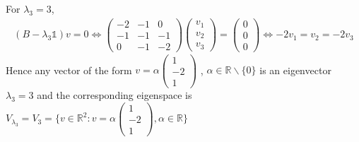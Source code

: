 \documentclass[a4paper,12pt,titlepage]{article}
\begin{document}
For $\lambda_3=3$,
\begin{align*}
(B-\lambda_3\mathds{1})v=0\Leftrightarrow\begin{pmatrix}
-2&-1&0\\-1&-1&-1\\0&-1&-2\end{pmatrix}\begin{pmatrix}
v_1\\v_2\\v_3\end{pmatrix}=\begin{pmatrix}
0\\0\\0\end{pmatrix}\Leftrightarrow -2v_1=v_2=-2v_3
\end{align*}
Hence any vector of the form $v = \alpha\begin{pmatrix}
1\\-2\\1\end{pmatrix}$
, $\alpha \in \mathbb{R} \backslash \lbrace0\rbrace$ is an eigenvector $\lambda_3 = 3$ and the corresponding eigenspace is
$V_{\lambda_3}=V_{3}=\lbrace v\in\mathbb{R}^2:v=\alpha\begin{pmatrix}
1\\-2\\1\end{pmatrix} ,\alpha \in \mathbb{R} \rbrace$
\end{document}
